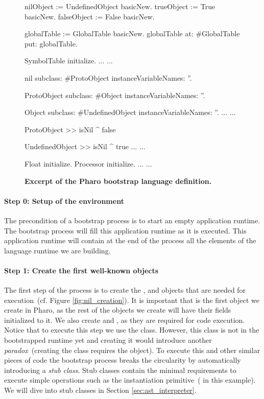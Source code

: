 \begin{figure}[ht]
\begin{code}
nilObject := UndefinedObject basicNew.
trueObject := True basicNew.
falseObject := False basicNew.

globalTable := GlobalTable basicNew.
globalTable
    at: #GlobalTable
    put: globalTable.
    
SymbolTable initialize.
...
...

nil subclass: #ProtoObject
    instanceVariableNames: ''.

ProtoObject subclass: #Object
    instanceVariableNames: ''.
    
Object subclass: #UndefinedObject
    instanceVariableNames: ''.
...
...

ProtoObject >> isNil
   ^ false

UndefinedObject >> isNil
   ^ true
...
...
    
Float initialize.
Processor initialize.
...
...
\end{code}
\caption{\textbf{Excerpt of the Pharo bootstrap language definition.}\label{fig:example_language_definition}}
\end{figure}

\paragraph{Step 0: Setup of the environment} The precondition of a bootstrap process is to start an empty application runtime. The bootstrap process will fill this application runtime as it is executed. This application runtime will contain at the end of the process all the elements of the language runtime we are building.

\paragraph{\textbf{Step 1: Create the first well-known objects}}\label{sec:create_nil}

The first step of the process is to create the ,  and  objects that are needed for execution~(cf. Figure \ref{fig:nil_creation}). It is important that  is the first object we create in Pharo, as the rest of the objects we create will have their fields initialized to it. We also create  and , as they are required for code execution. Notice that to execute this step we use the  class. However, this class is not in the bootstrapped runtime yet and creating it would introduce another \emph{paradox}~(\eg creating the  class requires the  object). To execute this and other similar pieces of code the bootstrap process breaks the circularity by automatically introducing a \emph{stub class}. Stub classes contain the minimal requirements to execute simple operations such as the instantiation primitive~( in this example). We will dive into stub classes in Section \ref{sec:ast_interpreter}.

